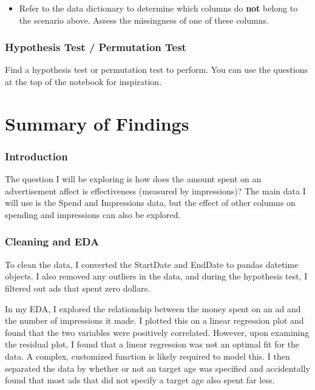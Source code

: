 \documentclass[11pt]{article}
\providecommand{\tightlist}{%
      \setlength{\itemsep}{0pt}\setlength{\parskip}{0pt}}
\begin{document}
\begin{itemize}
\tightlist
\item
  Refer to the data dictionary to determine which columns do
  \textbf{not} belong to the scenario above. Assess the missingness of
  one of these columns.
\end{itemize}

\hypertarget{hypothesis-test-permutation-test}{%
\subsubsection{Hypothesis Test / Permutation
Test}\label{hypothesis-test-permutation-test}}

Find a hypothesis test or permutation test to perform. You can use the
questions at the top of the notebook for inspiration.

    \hypertarget{summary-of-findings}{%
\section{Summary of Findings}\label{summary-of-findings}}

\hypertarget{introduction}{%
\subsubsection{Introduction}\label{introduction}}

The question I will be exploring is how does the amount spent on an
advertisement affect is effectiveness (measured by impressions)? The
main data I will use is the Spend and Impressions data, but the effect
of other columns on spending and impressions can also be explored.

\hypertarget{cleaning-and-eda}{%
\subsubsection{Cleaning and EDA}\label{cleaning-and-eda}}

To clean the data, I converted the StartDate and EndDate to pandas
datetime objects. I also removed any outliers in the data, and during
the hypothesis test, I filtered out ads that spent zero dollars.

In my EDA, I explored the relationship between the money spent on an ad
and the number of impressions it made. I plotted this on a linear
regression plot and found that the two variables were positively
correlated. However, upon examining the residual plot, I found that a
linear regression was not an optimal fit for the data. A complex,
customized function is likely required to model this. I then separated
the data by whether or not an target age was specified and accidentally
found that most ads that did not specify a target age also spent far
less.
\end{document}

